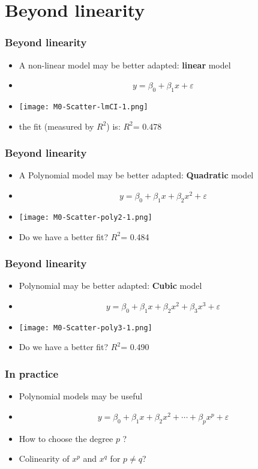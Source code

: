 \documentclass[xcolor=x11names,compress, aspectratio=169]{beamer}
\renewcommand{\(}{\begin{columns}}
\renewcommand{\)}{\end{columns}}
\newcommand{\<}[1]{\begin{column}{#1}}
\renewcommand{\>}{\end{column}}
\begin{document}
\section{Beyond linearity}
\begin{frame} %
\frametitle{Beyond linearity}

\begin{itemize}
 \item A non-linear model may be better adapted: \textbf{linear} model
 \item[]  $$y = \beta_0 + \beta_1 x + \varepsilon$$
 \item[] \texttt{[image: M0-Scatter-lmCI-1.png]}
 \item[] the fit (measured by $R^2$) is: $R^2$= 0.478
 \end{itemize}
\end{frame}


\begin{frame} %
\frametitle{Beyond linearity}

\begin{itemize}
 \item A Polynomial model may be better adapted: \textbf{Quadratic} model
 \item[]  $$y = \beta_0 + \beta_1 x +  \beta_2 x^2+ \varepsilon$$
 \item[] \texttt{[image: M0-Scatter-poly2-1.png]}
 \item[] Do we have a better fit? $R^2$= 0.484
 \end{itemize}
\end{frame}

\begin{frame} %
\frametitle{Beyond linearity}

\begin{itemize}
 \item Polynomial may be better adapted: \textbf{Cubic} model
 \item[]  $$y = \beta_0 + \beta_1 x +  \beta_2 x^2 + \beta_3 x^3+ \varepsilon$$
 \item[] \texttt{[image: M0-Scatter-poly3-1.png]}
 \item[] Do we have a better fit? $R^2$= 0.490
 \end{itemize}
\end{frame}

\begin{frame} %
\frametitle{In practice}

\begin{itemize}[<+->]
 \item Polynomial models may be useful
 \item[]  $$y = \beta_0 + \beta_1 x +  \beta_2 x^2 + \cdots + \beta_p x^p + \varepsilon$$
 \item[] How to choose the degree $p$ ?
 \item[] Colinearity of $x^p$ and $x^q$ for $ p \neq q$? 
 \end{itemize}
\end{frame}
\end{document}
